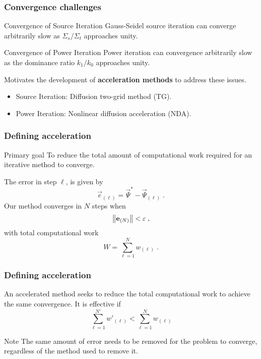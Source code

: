 \documentclass[xcolor=x11names, compress]{beamer}
\begin{document}
\begin{frame}
  \frametitle{Convergence challenges}
\begin{block}{Convergence of Source Iteration}
  Gauss-Seidel source iteration can converge arbitrarily slow as
  $\Sigma_s/\Sigma_t$ approaches unity.
\end{block}
\pause
\begin{block}{Convergence of Power Iteration}
  Power iteration can convergence arbitrarily slow as the dominance
  ratio $k_1/k_0$ approaches unity.
\end{block}
\pause
Motivates the development of \textbf{acceleration methods} to address these issues.
\begin{itemize}
  \item Source Iteration: Diffusion two-grid method (TG).
  \item Power Iteration: Nonlinear diffusion acceleration (NDA).
\end{itemize}

\end{frame}
\begin{frame}
  \frametitle{Defining acceleration}
  \pause
  \begin{block}{Primary goal}
    To reduce the total amount of computational work required for an
    iterative method to converge\cite{adams1993}.
  \end{block}
\pause
The error in step $\ell$, is given by
\begin{equation*}
  \vec{e}_{(\ell)} = \vec{\Psi}^* - \vec{\Psi}_{(\ell)}\;.
\end{equation*}
\pause
Our method converges in $N$ steps when
\begin{equation*}
  \left\lVert\mathbf{e}_{(N)}\right\rVert < \varepsilon\;,
\end{equation*}
\pause
with total computational work
\begin{equation*}
  W = \sum_{\ell = 1}^N w_{(\ell)}\;.
\end{equation*}
\end{frame}
\begin{frame}
  \frametitle{Defining acceleration}
  An accelerated method seeks to reduce the total computational work
  to achieve the same convergence. It is effective if
  \begin{equation*}
    \sum_{\ell = 1}^{N'}w'_{(\ell)} <  \sum_{\ell = 1}^Nw_{(\ell)}
  \end{equation*}
\pause
  \begin{block}{Note}
    The same amount of error needs to be removed for the problem to
    converge, regardless of the method used to remove it.
  \end{block}
\end{frame}
\end{document}
